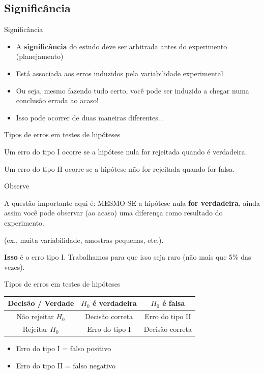 \documentclass{beamer}
\begin{document}
\subsection{Significância}
\begin{frame}{Significância}
  \begin{itemize}
  \item A {\bf significância} do estudo deve ser arbitrada antes do experimento (planejamento)
  \item Está associada aos erros induzidos pela variabilidade experimental
  \item Ou seja, mesmo fazendo tudo certo, você pode ser induzido a chegar numa conclusão errada ao acaso!
  \item Isso pode ocorrer de duas maneiras diferentes...
  \end{itemize}
\end{frame}

\begin{frame}{Tipos de erros em testes de hipóteses}
  \begin{definition}
    Um \alert{erro do tipo I} ocorre se a hipótese nula for rejeitada
    quando é verdadeira.
  \end{definition}
  \begin{definition}
    Um \alert{erro do tipo II} ocorre se a hipótese não for rejeitada
    quando for falsa.
  \end{definition}
\end{frame}

\begin{frame}{Observe}
  \begin{block}{A questão importante aqui é:}
    MESMO SE a hipótese nula {\bf for verdadeira}, ainda assim você pode observar (ao acaso) uma diferença como resultado do experimento.

    \bigskip
    (ex., muita variabilidade, amostras pequenas, etc.).

    \bigskip
    {\bf Isso} é o erro tipo I. Trabalhamos para que isso seja raro (não mais que 5\% das vezes).
  \end{block}
\end{frame}

\begin{frame}{Tipos de erros em testes de hipóteses}
  \begin{block}{}
    \begin{tabular}{c||c|c}
      Decisão / Verdade & $H_0$ é verdadeira & $H_0$ é falsa \\
      \hline
      \hline
      Não rejeitar $H_0$ & Decisão correta & Erro do tipo II\\
      \hline
      Rejeitar $H_0$ & Erro do tipo I & Decisão correta\\
    \end{tabular}
  \end{block}
  \begin{itemize}
  \item Erro do tipo I = falso positivo
  \item Erro do tipo II = falso negativo
  \end{itemize}
\end{frame}
\end{document}
